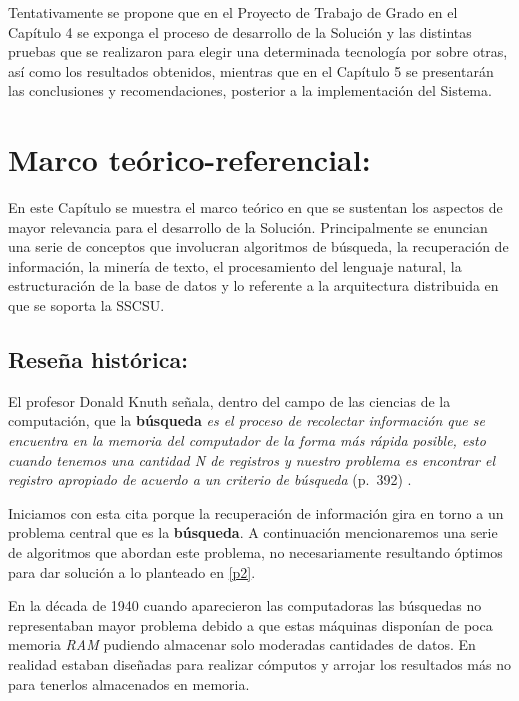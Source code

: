 \documentclass[
  10,
  openany]{book}
\begin{document}
Tentativamente se propone que en el Proyecto de Trabajo de Grado en el Capítulo 4 se exponga el proceso de desarrollo de la Solución y las distintas pruebas que se realizaron para elegir una determinada tecnología por sobre otras, así como los resultados obtenidos, mientras que en el Capítulo 5 se presentarán las conclusiones y recomendaciones, posterior a la implementación del Sistema.

\hypertarget{teorico}{%
\chapter{Marco teórico-referencial:}\label{teorico}}

En este Capítulo se muestra el marco teórico en que se sustentan los aspectos de mayor relevancia para el desarrollo de la Solución. Principalmente se enuncian una serie de conceptos que involucran algoritmos de búsqueda, la recuperación de información, la minería de texto, el procesamiento del lenguaje natural, la estructuración de la base de datos y lo referente a la arquitectura distribuida en que se soporta la SSCSU.

\hypertarget{alghist}{%
\section{Reseña histórica:}\label{alghist}}

El profesor Donald Knuth señala, dentro del campo de las ciencias de la computación, que la \textbf{búsqueda} \emph{es el proceso de recolectar información que se encuentra en la memoria del computador de la forma más rápida posible, esto cuando tenemos una cantidad N de registros y nuestro problema es encontrar el registro apropiado de acuerdo a un criterio de búsqueda} \citep{knuth1997} (p.~392) .

Iniciamos con esta cita porque la recuperación de información gira en torno a un problema central que es la \textbf{búsqueda}. A continuación mencionaremos una serie de algoritmos que abordan este problema, no necesariamente resultando óptimos para dar solución a lo planteado en \ref{p2}.

En la década de 1940 cuando aparecieron las computadoras las búsquedas no representaban mayor problema debido a que estas máquinas disponían de poca memoria \emph{RAM} pudiendo almacenar solo moderadas cantidades de datos. En realidad estaban diseñadas para realizar cómputos y arrojar los resultados más no para tenerlos almacenados en memoria.
\end{document}
